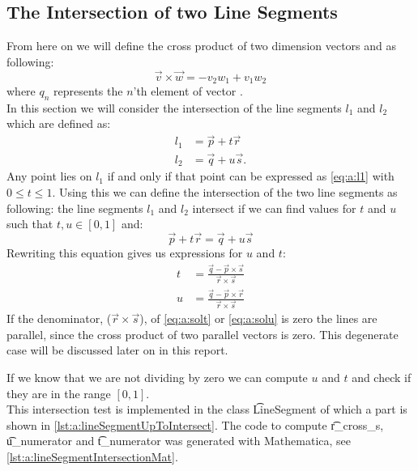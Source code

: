 \subsection*{The Intersection of two Line Segments}
	From here on we will define the cross product of two dimension vectors  and  as following:
	\begin{equation}
		\vec{v} \times \vec{w} = - v_2 w_1 + v_1 w_2
	\end{equation}
	where $q_n$ represents the $n$'th element of vector .\\

	In this section we will consider the intersection of the line segments $l_1$ and $l_2$ \cite{so} which are defined as:
	\begin{align}
		l_1 &= \vec{p} + t \vec{r} \label{eq:a:l1}\\
		l_2 &= \vec{q} + u \vec{s} \label{eq:a:l2}.
	\end{align}
	Any point lies on $l_1$ if and only if that point can be expressed as \eqref{eq:a:l1} with $0 \leq t \leq 1$. Using this we can define the intersection  of the two line segments as following: the line segments $l_1$ and $l_2$ intersect if we can find values for $t$ and $u$ such that $t, u \in [0, 1]$ and:
		\begin{equation}
			\vec{p} + t \vec{r} = \vec{q} + u \vec{s}
		\end{equation}
	Rewriting this equation gives us expressions for $u$ and $t$:
	\begin{align}
		t &= \frac{\vec{q} - \vec{p} \times \vec{s}}{\vec{r} \times \vec{s}} \label{eq:a:solt}\\
		u &= \frac{\vec{q} - \vec{p} \times \vec{r}}{\vec{r} \times \vec{s}} \label{eq:a:solu}
	\end{align}
	If the denominator, ($\vec{r} \times \vec{s}$), of \eqref{eq:a:solt} or \eqref{eq:a:solu} is zero the lines are parallel, since the cross product of two parallel vectors is zero. This degenerate case will be discussed later on in this report.

	If we know that we are not dividing by zero we can compute $u$ and $t$ and check if they are in the range $[0,1]$.\\

	This intersection test is implemented in the class \t{LineSegment} of which a part is shown in \autoref{lst:a:lineSegmentUpToIntersect}. The code to compute \t{r_cross_s}, \t{u_numerator} and \t{t_numerator} was generated with Mathematica, see \autoref{lst:a:lineSegmentIntersectionMat}.\\

